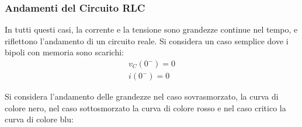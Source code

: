 \documentclass{article}
\numberwithin{equation}{subsection}
\begin{document}
\subsubsection{Andamenti del Circuito RLC}

In tutti questi casi, la corrente e la tensione sono grandezze continue nel tempo, e riflettono l'andamento di un circuito reale. Si considera un caso semplice dove i 
bipoli con memoria sono scarichi:
\begin{gather*}
    v_C(0^-)=0\\
    i(0^-)=0
\end{gather*}

Si considera l'andamento delle grandezze nel caso sovrasmorzato, la curva di colore nero, nel caso sottosmorzato la curva di colore rosso e nel caso critico la curva di colore blu: 
\end{document}
